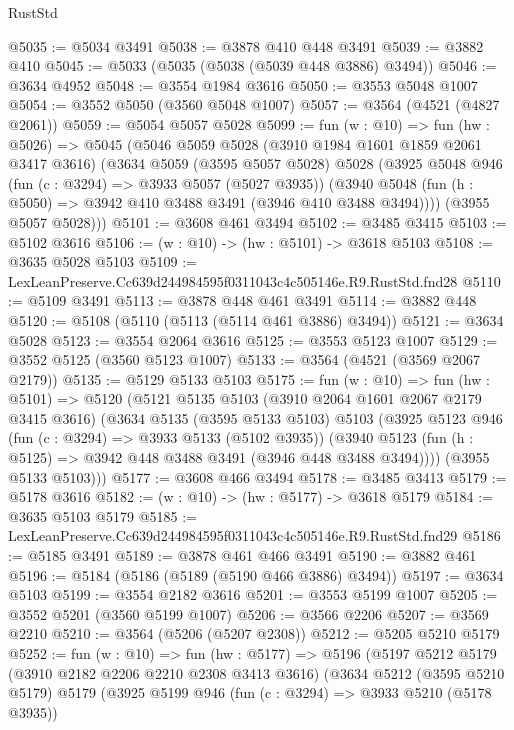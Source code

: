 \begin{lexlean}{RustStd}
\begin{coremodule}
@5035 := @5034 @3491
@5038 := @3878 @410 @448 @3491
@5039 := @3882 @410
@5045 := @5033 (@5035 (@5038 (@5039 @448 @3886) @3494))
@5046 := @3634 @4952
@5048 := @3554 @1984 @3616
@5050 := @3553 @5048 @1007
@5054 := @3552 @5050 (@3560 @5048 @1007)
@5057 := @3564 (@4521 (@4827 @2061))
@5059 := @5054 @5057 @5028
@5099 := fun (w : @10) =>
  fun (hw : @5026) =>
  @5045
    (@5046
      @5059
      @5028
      (@3910 @1984 @1601 @1859 @2061 @3417 @3616)
      (@3634
        @5059
        (@3595 @5057 @5028)
        @5028
        (@3925
          @5048
          @946
          (fun (c : @3294) => @3933 @5057 (@5027 @3935))
          (@3940 @5048 (fun (h : @5050) => @3942 @410 @3488 @3491 (@3946 @410 @3488 @3494))))
        (@3955 @5057 @5028)))
@5101 := @3608 @461 @3494
@5102 := @3485 @3415
@5103 := @5102 @3616
@5106 := (w : @10) -> (hw : @5101) -> @3618 @5103
@5108 := @3635 @5028 @5103
@5109 := LexLeanPreserve.Cc639d244984595f0311043c4c505146e.R9.RustStd.fnd28
@5110 := @5109 @3491
@5113 := @3878 @448 @461 @3491
@5114 := @3882 @448
@5120 := @5108 (@5110 (@5113 (@5114 @461 @3886) @3494))
@5121 := @3634 @5028
@5123 := @3554 @2064 @3616
@5125 := @3553 @5123 @1007
@5129 := @3552 @5125 (@3560 @5123 @1007)
@5133 := @3564 (@4521 (@3569 @2067 @2179))
@5135 := @5129 @5133 @5103
@5175 := fun (w : @10) =>
  fun (hw : @5101) =>
  @5120
    (@5121
      @5135
      @5103
      (@3910 @2064 @1601 @2067 @2179 @3415 @3616)
      (@3634
        @5135
        (@3595 @5133 @5103)
        @5103
        (@3925
          @5123
          @946
          (fun (c : @3294) => @3933 @5133 (@5102 @3935))
          (@3940 @5123 (fun (h : @5125) => @3942 @448 @3488 @3491 (@3946 @448 @3488 @3494))))
        (@3955 @5133 @5103)))
@5177 := @3608 @466 @3494
@5178 := @3485 @3413
@5179 := @5178 @3616
@5182 := (w : @10) -> (hw : @5177) -> @3618 @5179
@5184 := @3635 @5103 @5179
@5185 := LexLeanPreserve.Cc639d244984595f0311043c4c505146e.R9.RustStd.fnd29
@5186 := @5185 @3491
@5189 := @3878 @461 @466 @3491
@5190 := @3882 @461
@5196 := @5184 (@5186 (@5189 (@5190 @466 @3886) @3494))
@5197 := @3634 @5103
@5199 := @3554 @2182 @3616
@5201 := @3553 @5199 @1007
@5205 := @3552 @5201 (@3560 @5199 @1007)
@5206 := @3566 @2206
@5207 := @3569 @2210
@5210 := @3564 (@5206 (@5207 @2308))
@5212 := @5205 @5210 @5179
@5252 := fun (w : @10) =>
  fun (hw : @5177) =>
  @5196
    (@5197
      @5212
      @5179
      (@3910 @2182 @2206 @2210 @2308 @3413 @3616)
      (@3634
        @5212
        (@3595 @5210 @5179)
        @5179
        (@3925
          @5199
          @946
          (fun (c : @3294) => @3933 @5210 (@5178 @3935))

\end{coremodule}
\end{lexlean}
